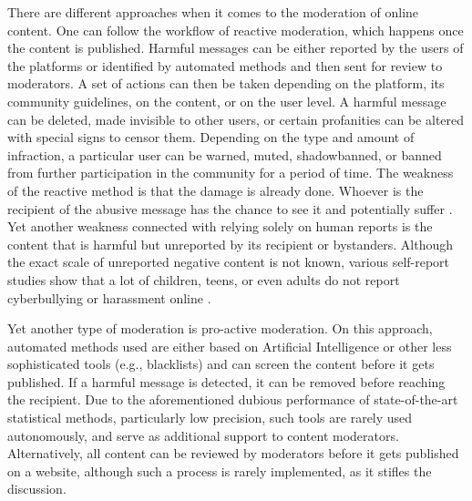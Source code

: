 \documentclass[preprint,12pt]{elsarticle}
\begin{document}
There are different approaches when it comes to the moderation of online content. One can follow the workflow of reactive moderation, which happens once the content is published. Harmful messages can be either reported by the users of the platforms or identified by automated methods and then sent for review to moderators. A set of actions can then be taken depending on the platform, its community guidelines, on the content, or on the user level. A harmful message can be deleted, made invisible to other users, or certain profanities can be altered with special signs to censor them. Depending on the type and amount of infraction, a particular user can be warned, muted, shadowbanned, or banned from further participation in the community for a period of time. The weakness of the reactive method is that the damage is already done. Whoever is the recipient of the abusive message has the chance to see it and potentially suffer \citep{hoff2009cyberbullying, keipi2016online, wachs2019associations}. Yet another weakness connected with relying solely on human reports is the content that is harmful but unreported by its recipient or bystanders. Although the exact scale of unreported negative content is not known, various self-report studies show that a lot of children, teens, or even adults do not report cyberbullying or harassment online \citep{french_as_2021, ADL_free, noauthor_:game_nodate}.

Yet another type of moderation is pro-active moderation. On this approach, automated methods used are either based on Artificial Intelligence or other less sophisticated tools (e.g., blacklists) and can screen the content before it gets published. If a harmful message is detected, it can be removed before reaching the recipient. Due to the aforementioned dubious performance of state-of-the-art statistical methods, particularly low precision, such tools are rarely used autonomously, and serve as additional support to content moderators. Alternatively, all content can be reviewed by moderators before it gets published on a website, although such a process is rarely implemented, as it stifles the discussion. 
\end{document}
